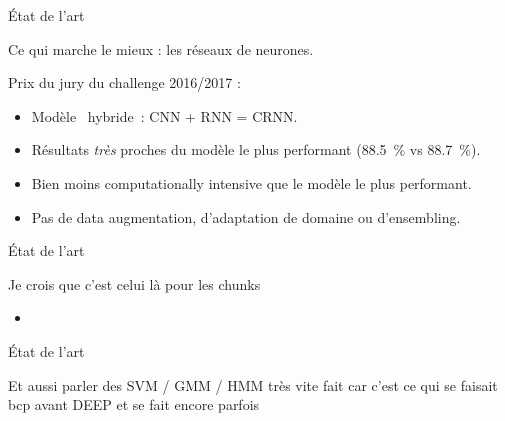 \documentclass[compress,xcolor=table]{beamer}
\begin{document}
\begin{frame}{État de l'art}

    Ce qui marche le mieux : les réseaux de neurones.

    Prix du jury du challenge 2016/2017 :

    \begin{exampleblock}{ \cite{cakirConvolutionalRecurrentNeural2017a}}

        \begin{itemize}
            \item Modèle \og~hybride~\fg : CNN + RNN = CRNN.
            \item Résultats \textit{très} proches du modèle le plus performant (88.5~\% vs 88.7~\%).
            \item Bien moins computationally intensive que le modèle le plus performant.
            \item Pas de data augmentation, d'adaptation de domaine ou d'ensembling.
        \end{itemize}

    \end{exampleblock}

\end{frame}

\begin{frame}{État de l'art}

    Je crois que c'est celui là pour les chunks

    \begin{exampleblock}{ \cite{lasseckAcousticBirdDetection2018}}

        \begin{itemize}
            \item
        \end{itemize}

    \end{exampleblock}

\end{frame}

\begin{frame}{État de l'art}

    Et aussi parler des SVM / GMM / HMM très vite fait car c'est ce qui se faisait bcp avant DEEP et se fait encore parfois

\end{frame}
\end{document}
